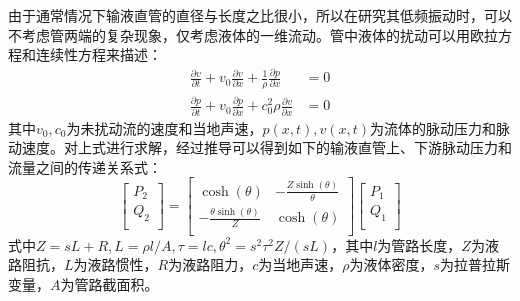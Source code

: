 \begin{enumerate}[label=\textbf{\Roman*.}, align=left, leftmargin=0pt, listparindent=\parindent, itemindent=!, labelwidth=\parindent, labelsep=0pt, itemsep=1em]
由于通常情况下输液直管的直径与长度之比很小，所以在研究其低频振动时，可以不考虑管两端的复杂现象，仅考虑液体的一维流动。管中液体的扰动可以用欧拉方程和连续性方程来描述：
\begin{align}
	\frac{\partial v}{\partial t}+{{v}_{0}}\frac{\partial v}{\partial x}+\frac{1}{\rho }\frac{\partial p}{\partial x}&=0 \nonumber \\
	\frac{\partial p}{\partial t}+{{v}_{0}}\frac{\partial p}{\partial x}+c_{0}^{2}\rho \frac{\partial v}{\partial x}&=0
\end{align}
其中$v_0,c_0$为未扰动流的速度和当地声速，$p(x,t),v(x,t)$为流体的脉动压力和脉动速度。对上式进行求解，经过推导可以得到如下的输液直管上、下游脉动压力和流量之间的传递关系式：
\begin{equation}
	\label{eq:Straight-Tube}
	\left[ \begin{matrix}
	   {{P}_{2}}  \\
	   {{Q}_{2}}  \\
	\end{matrix} \right]=\left[ \begin{matrix}
	   \cosh \left( \theta  \right) & {\displaystyle -\frac{Z\sinh \left( \theta  \right)}{\theta }}  \\
	   {\displaystyle -\frac{\theta \sinh \left( \theta  \right)}{Z}} & \cosh \left( \theta  \right)  \\
	\end{matrix} \right]\left[ \begin{matrix}
	   {{P}_{1}}  \\
	   {{Q}_{1}}  \\
	\end{matrix} \right]
\end{equation}
式中$Z=sL+R,L=\rho l/A,\tau =lc,\theta^2=s^2\tau^2Z/(sL)$，其中$l$为管路长度，$Z$为液路阻抗，$L$为液路惯性，$R$为液路阻力，$c$为当地声速，$\rho$为液体密度，$s$为拉普拉斯变量，$A$为管路截面积。


\end{enumerate}
